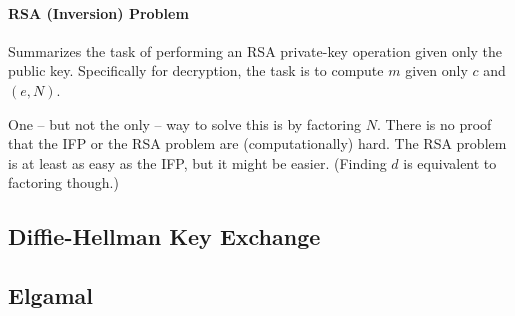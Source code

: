 \paragraph{RSA (Inversion) Problem}
Summarizes the task of performing an RSA private-key operation given only the public key.
Specifically for decryption, the task is to compute $m$ given only $c$ and $(e, N)$.

One -- but not the only -- way to solve this is by factoring $N$.
There is no proof that the IFP or the RSA problem are (computationally) hard.
The RSA problem is at least as easy as the IFP, but it might be easier.
(Finding $d$ is equivalent to factoring though.)


\subsection{Diffie-Hellman Key Exchange}


\subsection{Elgamal}
 
